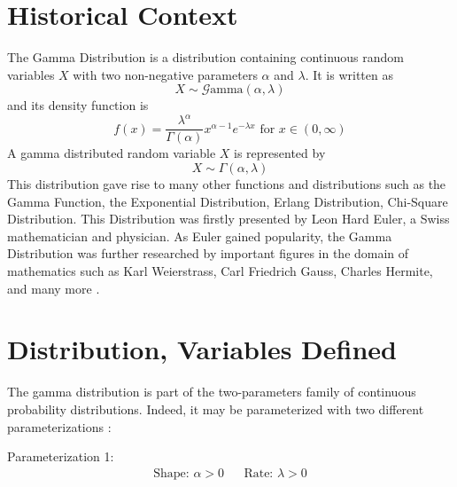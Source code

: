 \documentclass[12pt]{article}
\newcommand{\G}{\mathcal{G}}
\begin{document}
\singlespacing

\tableofcontents\pagebreak
\doublespacing
\section{Historical Context}
The Gamma Distribution is a distribution containing continuous random variables $X$ with two non-negative parameters
$\alpha$ and $\lambda$. It is written as
\begin{equation*}
	X\sim\G\text{amma}(\alpha, \lambda)
\end{equation*}
and its density function is
\begin{equation*}
	f(x)=\frac{\lambda^\alpha}{\Gamma(\alpha)}x^{\alpha-1}e^{-\lambda x}\text{ for }x\in(0,\infty)
\end{equation*}
A gamma distributed
random variable $X$ is represented by
\begin{equation*}
	X\sim\Gamma(\alpha,\lambda)
\end{equation*}
This distribution gave rise to many other functions and distributions such as the Gamma Function, the Exponential
Distribution, Erlang Distribution, Chi-Square Distribution. This Distribution was firstly presented by Leon Hard Euler,
a Swiss mathematician and physician. As Euler gained popularity, the Gamma Distribution was further researched by
important figures in the domain of mathematics such as Karl Weierstrass, Carl Friedrich Gauss, Charles Hermite, and many
more\cite{hoschGammaDistribution2017, wikipediaGammaDistribution2022, sebahIntroductionGammaFunction2002} .

\pagebreak
\section{Distribution, Variables Defined}
The gamma distribution is part of the two-parameters family of continuous probability distributions. Indeed, it may be
parameterized with two different parameterizations\cite{wikipediaGammaDistribution2022} :

\noindent Parameterization 1:
\vspace*{-24pt}
\begin{align}\label{eq:gamma:parameterization:1}
	\text{Shape: } \alpha>0		&&	\text{Rate: }\lambda>0
\end{align}
\end{document}
